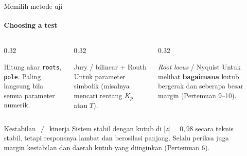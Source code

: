 \documentclass[aspectratio=169,10pt]{beamer}
\begin{document}
\begin{frame}{Memilih metode uji}
	\framesubtitle{Choosing a test}
	\begin{columns}[T]
		\begin{column}{0.32\textwidth}
			\begin{block}{Hitung akar}
				\small
				\texttt{roots}, \texttt{pole}. Paling langsung bila semua parameter numerik.
			\end{block}
		\end{column}
		\begin{column}{0.32\textwidth}
			\begin{block}{Jury / bilinear + Routh}
				\small
				Untuk parameter simbolik (misalnya mencari rentang $K_p$ atau $T$).
			\end{block}
		\end{column}
		\begin{column}{0.32\textwidth}
			\begin{block}{\textit{Root locus} / Nyquist}
				\small
				Untuk melihat \textbf{bagaimana} kutub bergerak dan seberapa besar margin (Pertemuan 9--10).
			\end{block}
		\end{column}
	\end{columns}
	\vspace{0.3cm}
	\begin{alertblock}{Kestabilan $\neq$ kinerja}
		\small Sistem stabil dengan kutub di $|z| = 0{,}98$ secara teknis stabil, tetapi responsnya lambat dan berosilasi panjang. Selalu periksa juga margin kestabilan dan daerah kutub yang diinginkan (Pertemuan 6).
	\end{alertblock}
\end{frame}
\end{document}
